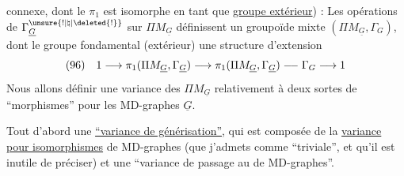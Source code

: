 connexe, dont le $\pi_1$ est isomorphe en tant que \uline{groupe extérieur}) :
Les opérations de $\Gamma^{\unsure{!|\natural|\deleted{!}}}_{\underline G}$ sur $\Pi M_{\underline G}$ définissent un groupoïde mixte $(\Pi M_{\underline G},\Gamma_G)$, dont le groupe fondamental (extérieur)    une structure d'extension
\[
(96)\quad1\longrightarrow\pi_1(\Pi M_{\underline G},\Gamma_{\underline G})\longrightarrow\pi_1(\Pi M_{\underline G},\Gamma_{\underline G})\relbar\joinrel\relbar\Gamma_G\longrightarrow1
\]
Nous allons définir une  variance des $\Pi M_{\underline G}$ relativement à deux sortes de ``morphismes'' pour les MD-graphes $\underline G$. 

Tout d'abord une \uline{``variance de générisation''}, qui est composée de la \uline{variance pour isomorphismes} de MD-graphes (que j'admets comme ``triviale'', et qu'il est inutile de préciser) et une ``variance de passage au  de MD-graphes''.

